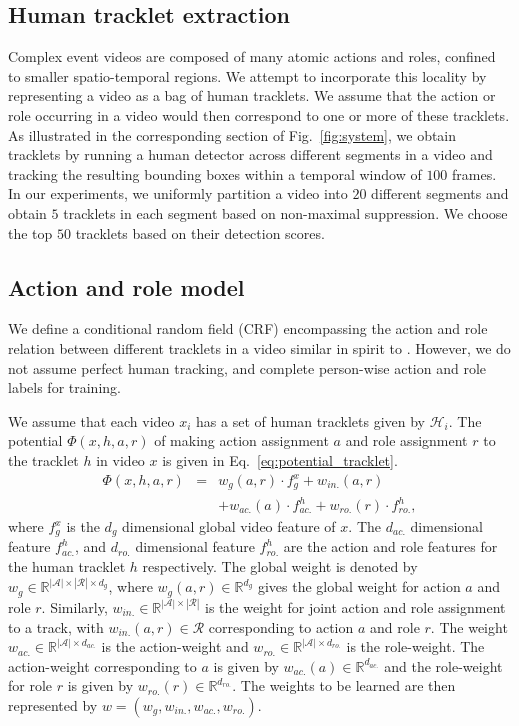 \documentclass[10pt,twocolumn,letterpaper]{article}
\begin{document}
\subsection{Human tracklet extraction}
Complex event videos are composed of many atomic actions and roles, 
confined to smaller spatio-temporal regions. 
We attempt to incorporate this locality by representing a video as a bag of human tracklets. 
We assume that the action or role occurring in a video would then correspond to one or more of these tracklets. 
As illustrated in the corresponding section of Fig.~\ref{fig:system}, 
we obtain tracklets by running a human detector \cite{Felzenszwalb_PAMI10} across different segments in a video 
and tracking the resulting bounding boxes within a temporal window of $100$ frames. 
In our experiments, we uniformly partition a video into $20$ different segments and obtain $5$ tracklets in each segment 
based on non-maximal suppression. We choose the top $50$ tracklets based on their detection scores.

\subsection{Action and role model}\label{sec:model_features}
We define a conditional random field (CRF) encompassing the action and role relation between different tracklets
in a video similar in spirit to \cite{Lan_CVPR12}. 
However, we do not assume perfect human tracking, 
and complete person-wise action and role labels for training. 

We assume that each video $x_i$ has a set of human tracklets given by $\mathcal{H}_i$. 
The potential $\Phi(x, h, a, r)$ of making
action assignment $a$ and role assignment $r$ to the tracklet $h$ in video $x$ is given in Eq.~\ref{eq:potential_tracklet}.
\vspace{-4pt}
\begin{eqnarray}\label{eq:potential_tracklet}
  \Phi(x, h, a, r) & = & w_{g}(a,r) \cdot f_{g}^x + w_{in.}(a,r) \\ \nonumber
                   & & + w_{ac.}(a) \cdot f_{ac.}^h + w_{ro.}(r) \cdot f_{ro.}^h, \nonumber
\end{eqnarray} where $f_g^x$ is the $d_g$ dimensional global video feature of $x$. The $d_{ac.}$ dimensional feature
$f_{ac.}^h$, and $d_{ro.}$ dimensional feature $f_{ro.}^h$ are the action and role features 
for the human tracklet $h$ respectively. The global weight is denoted 
by $w_g \in \mathbb{R}^{|\mathcal{A}| \times |\mathcal{R}| \times d_g}$, where $w_g(a,r) \in \mathbb{R}^{d_g}$
gives the global weight for action $a$ and role $r$.
Similarly, $w_{in.} \in \mathbb{R}^{|\mathcal{A}| \times |\mathcal{R}|}$ is the weight for joint 
action and role assignment to a track, with $w_{in.}(a,r) \in \mathcal{R}$ corresponding to action $a$ and role $r$. 
The weight $w_{ac.} \in \mathbb{R}^{|\mathcal{A}| \times d_{ac.}}$
is the action-weight and $w_{ro.} \in \mathbb{R}^{|\mathcal{A}| \times d_{ro.}}$ is the role-weight. The action-weight corresponding
to $a$ is given by $w_{ac.}(a) \in \mathbb{R}^{d_{ac.}}$ and the role-weight for role $r$ is given by $w_{ro.}(r) \in \mathbb{R}^{d_{ro.}}$.
The weights to be learned are then represented by $w = (w_g, w_{in.}, w_{ac.}, w_{ro.})$.
\end{document}
